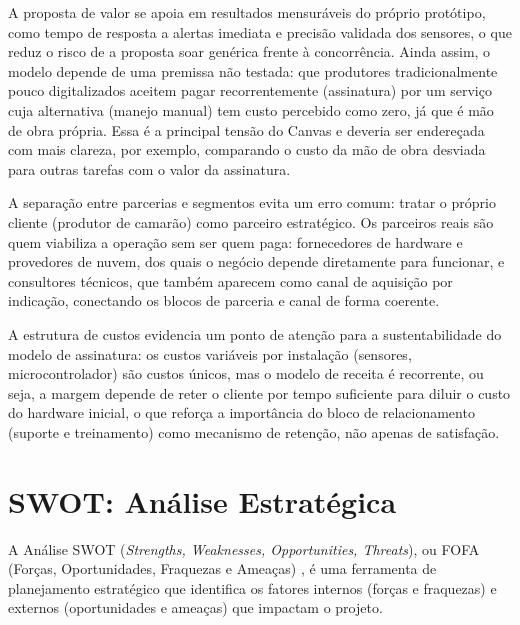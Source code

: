 \documentclass[11pt,a4paper]{article}
\begin{document}
A proposta de valor se apoia em resultados mensuráveis do próprio protótipo, como tempo de resposta a alertas imediata e precisão validada dos sensores, o que reduz o risco de a proposta soar genérica frente à concorrência. Ainda assim, o modelo depende de uma premissa não testada: que produtores tradicionalmente pouco digitalizados aceitem pagar recorrentemente (assinatura) por um serviço cuja alternativa (manejo manual) tem custo percebido como zero, já que é mão de obra própria. Essa é a principal tensão do Canvas e deveria ser endereçada com mais clareza, por exemplo, comparando o custo da mão de obra desviada para outras tarefas com o valor da assinatura.

A separação entre parcerias e segmentos evita um erro comum: tratar o próprio cliente (produtor de camarão) como parceiro estratégico. Os parceiros reais são quem viabiliza a operação sem ser quem paga: fornecedores de hardware e provedores de nuvem, dos quais o negócio depende diretamente para funcionar, e consultores técnicos, que também aparecem como canal de aquisição por indicação, conectando os blocos de parceria e canal de forma coerente.

A estrutura de custos evidencia um ponto de atenção para a sustentabilidade do modelo de assinatura: os custos variáveis por instalação (sensores, microcontrolador) são custos únicos, mas o modelo de receita é recorrente, ou seja, a margem depende de reter o cliente por tempo suficiente para diluir o custo do hardware inicial, o que reforça a importância do bloco de relacionamento (suporte e treinamento) como mecanismo de retenção, não apenas de satisfação.

\section{SWOT: Análise Estratégica}

A Análise SWOT (\textit{Strengths, Weaknesses, Opportunities, Threats}), ou FOFA (Forças, Oportunidades, Fraquezas e Ameaças) \cite{chiavenato2020}, é uma ferramenta de planejamento estratégico que identifica os fatores internos (forças e fraquezas) e externos (oportunidades e ameaças) que impactam o projeto.
\end{document}
